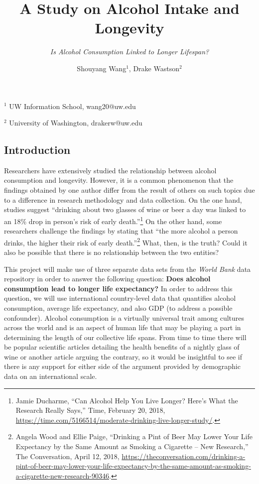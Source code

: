 \documentclass[
]{article}
\title{\textbf{A Study on Alcohol Intake and Longevity}}
\subtitle{\emph{Is Alcohol Consumption Linked to Longer Lifespan?}}
\author{Shouyang Wang\(^{1}\), Drake Wastson\(^{2}\)}
\date{}
\begin{document}
\maketitle

\begin{center}
$^{1}$ UW Information School, wang20@uw.edu

$^{2}$ University of Washington, drakerw@uw.edu
\end{center}

\hypertarget{introduction}{%
\subsection{Introduction}\label{introduction}}

Researchers have extensively studied the relationship between alcohol
consumption and longevity. However, it is a common phenomenon that the
findings obtained by one author differ from the result of others on such
topics due to a difference in research methodology and data collection.
On the one hand, studies suggest ``drinking about two glasses of wine or
beer a day was linked to an 18\% drop in person's risk of early
death.''\footnote{Jamie Ducharme, ``Can Alcohol Help You Live Longer?
  Here's What the Research Really Says,'' Time, February 20, 2018,
  \url{https://time.com/5166514/moderate-drinking-live-longer-study/}.}
On the other hand, some researchers challenge the findings by stating
that ``the more alcohol a person drinks, the higher their risk of early
death.''\footnote{Angela Wood and Ellie Paige, ``Drinking a Pint of Beer
  May Lower Your Life Expectancy by the Same Amount as Smoking a
  Cigarette -- New Research,'' The Conversation, April 12, 2018,
  \url{https://theconversation.com/drinking-a-pint-of-beer-may-lower-your-life-expectancy-by-the-same-amount-as-smoking-a-cigarette-new-research-90346}.}
What, then, is the truth? Could it also be possible that there is no
relationship between the two entities?

This project will make use of three separate data sets from the
\emph{World Bank} data repository in order to answer the following
question: \textbf{Does alcohol consumption lead to longer life
expectancy?} In order to address this question, we will use
international country-level data that quantifies alcohol consumption,
average life expectancy, and also GDP (to address a possible
confounder). Alcohol consumption is a virtually universal trait among
cultures across the world and is an aspect of human life that may be
playing a part in determining the length of our collective life spans.
From time to time there will be popular scientific articles detailing
the health benefits of a nightly glass of wine or another article
arguing the contrary, so it would be insightful to see if there is any
support for either side of the argument provided by demographic data on
an international scale.
\end{document}
